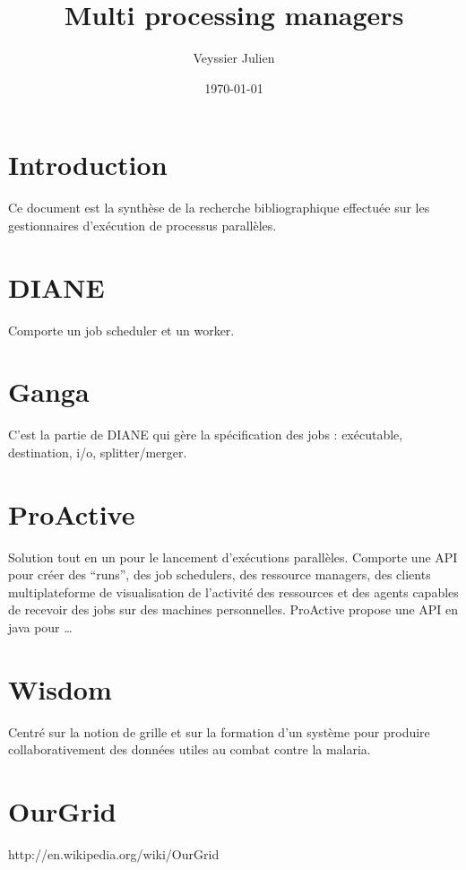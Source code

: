 \documentclass[12pt,a4paper]{article}
\author{Veyssier Julien}
\title{Multi processing managers}
\date\today
\begin{document}
\maketitle
\newpage

\tableofcontents

\newpage
 

\section{Introduction}
Ce document est la synthèse de la recherche bibliographique effectu\'ee sur les gestionnaires d'ex\'ecution
de processus parallèles.

\section{DIANE}
Comporte un job scheduler et un worker. 

\section{Ganga}
C'est la partie de DIANE qui gère la sp\'ecification des jobs : ex\'ecutable, destination, i/o, splitter/merger.

\section{ProActive}
Solution tout en un pour le lancement d'ex\'ecutions parallèles. Comporte une API pour cr\'eer des ``runs'', des job schedulers,
des ressource managers, des clients multiplateforme de visualisation de l'activit\'e des ressources et des agents capables de recevoir des jobs sur
des machines personnelles.
ProActive propose une API en java pour \ldots

\section{Wisdom}
Centr\'e sur la notion de grille et sur la formation d'un système pour produire collaborativement des donn\'ees utiles
au combat contre la malaria.

\section{OurGrid}
http://en.wikipedia.org/wiki/OurGrid
\end{document}
